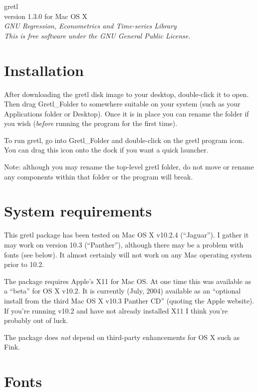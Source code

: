 \documentclass[11pt]{article}
\begin{document}
\begin{center}
{\color{gold} \titlefont gretl} \\[1ex]
version 1.3.0 for Mac OS X \\[2ex]

\textit{GNU Regression, Econometrics and Time-series Library\\
  This is free software under the GNU General Public License.}

\end{center}

\section{Installation}
\label{sec:install}

After downloading the gretl disk image to your desktop, double-click it
to open. Then drag \textsf{Gretl\_Folder} to somewhere suitable on your
system (such as your Applications folder or Desktop).  Once it is in
place you can rename the folder if you wish (\textit{before} running the
program for the first time).

To run gretl, go into \textsf{Gretl\_Folder} and double-click on the
gretl program icon.  You can drag this icon onto the dock if you want
a quick launcher.  

Note: although you may rename the top-level gretl folder, do not move
or rename any components within that folder or the program will break.

\section{System requirements}
\label{sec:os}

This gretl package has been tested on Mac OS X v10.2.4 (``Jaguar'').
I gather it may work on version 10.3 (``Panther''), although there may
be a problem with fonts (see below).  It almost certainly will not
work on any Mac operating system prior to 10.2.

The package requires Apple's X11 for Mac OS.  At one time this was
available as a ``beta'' for OS X v10.2.  It is currently (July, 2004)
available as an ``optional install from the third Mac OS X v10.3
Panther CD'' (quoting the Apple website).  If you're running v10.2 and
have not already installed X11 I think you're probably out of luck.

The package does \textit{not} depend on third-party enhancements for
OS X such as \textsf{Fink}.

\section{Fonts}
\label{sec:fonts}
\end{document}
